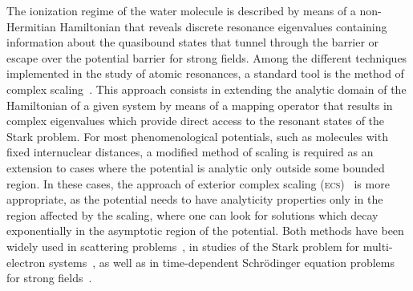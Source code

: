 The ionization regime of the water molecule is described by means of a
non-Hermitian Hamiltonian that reveals discrete resonance eigenvalues
containing information about the quasibound states that tunnel through
the barrier or escape over the potential barrier for strong
fields. Among the different techniques implemented in the study of
atomic resonances, a standard tool is the method of complex
scaling~\cite{complexScaling,complexScalingBaslev,complexScalingSimon}. This
approach consists in extending the analytic domain of the Hamiltonian
of a given system by means of a mapping operator that results in
complex eigenvalues which provide direct access to the resonant states
of the Stark problem. For most phenomenological potentials, such as
molecules with fixed internuclear distances, a modified method of
scaling is required as an extension to cases where the potential is
analytic only outside some bounded region. In these cases, the
approach of exterior complex scaling (\textsc{ecs})~\cite{Simon_1979}
is more appropriate, as the potential needs to have analyticity
properties only in the region affected by the scaling, where one can
look for solutions which decay exponentially in the asymptotic region
of the potential. Both methods have been widely used in scattering
problems~\cite{complexScalingBaslev, complexScalingSimon}, in studies
of the Stark problem for multi-electron
systems~\cite{ScrinziJChemPhys_ECS,ScrinziJPhysB_ECS}, as well as in
time-dependent Schr\"{o}dinger equation problems for strong
fields~\cite{ecsRuiz, ecsTao, ecsScrinzi}.

